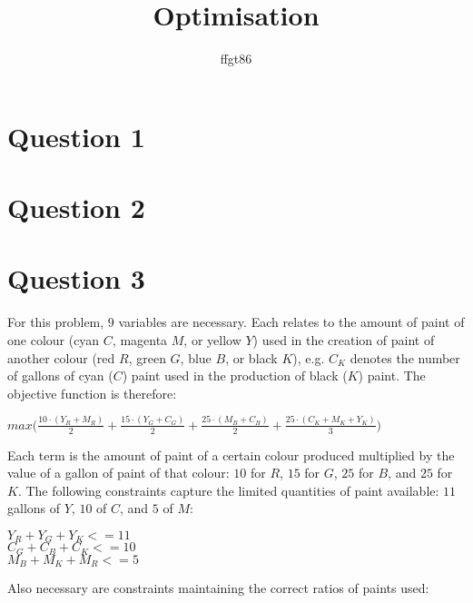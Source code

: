 \documentclass[11pt]{article} %
\title{Optimisation}
\author{ffgt86}
\begin{document}
\maketitle

\section*{Question 1}

\section*{Question 2}

\clearpage

\section*{Question 3}

For this problem, $9$ variables are necessary. Each relates to the amount of paint of one colour (cyan $C$, magenta $M$, or yellow $Y$) used in the creation of paint of another colour (red $R$, green $G$, blue $B$, or black $K$), e.g. $C_K$ denotes the number of gallons of cyan ($C$) paint used in the production of black ($K$) paint. The objective function is therefore:

\begin{center}

$max \bigl( \frac{10 \cdot (Y_R + M_R)}{2} + \frac{15 \cdot (Y_G + C_G)}{2} + \frac{25 \cdot (M_B + C_B)}{2} + \frac{25 \cdot (C_K + M_K + Y_K)}{3}\bigr)$

\end{center}

Each term is the amount of paint of a certain colour produced multiplied by the value of a gallon of paint of that colour: $10$ for $R$, $15$ for $G$, $25$ for $B$, and $25$ for $K$. The following constraints capture the limited quantities of paint available: $11$ gallons of $Y$, $10$ of $C$, and $5$ of $M$:

\begin {center}

$Y_R + Y_G + Y_K <= 11$ \\
$C_G + C_B + C_K <= 10$ \\
$M_B + M_K +M_R <= 5$ \\

\end{center}

Also necessary are constraints maintaining the correct ratios of paints used:
\end{document}
